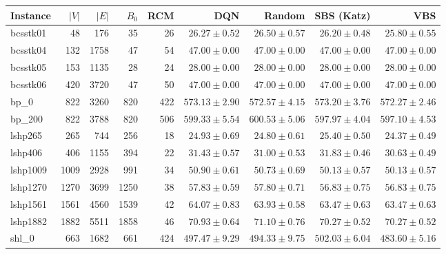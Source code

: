 \begin{tabular}{lrrrrrrrr}
\toprule
Instance & $|V|$ & $|E|$ & $B_0$ & RCM & DQN & Random & SBS (Katz) & VBS\\
\midrule
bcsstk01 & 48 & 176 & 35 & 26 & $26.27\pm0.52$ & $26.50\pm0.57$ & $26.20\pm0.48$ & $25.80\pm0.55$\\
bcsstk04 & 132 & 1758 & 47 & 54 & $47.00\pm0.00$ & $47.00\pm0.00$ & $47.00\pm0.00$ & $47.00\pm0.00$\\
bcsstk05 & 153 & 1135 & 28 & 24 & $28.00\pm0.00$ & $28.00\pm0.00$ & $28.00\pm0.00$ & $28.00\pm0.00$\\
bcsstk06 & 420 & 3720 & 47 & 50 & $47.00\pm0.00$ & $47.00\pm0.00$ & $47.00\pm0.00$ & $47.00\pm0.00$\\
bp\_0 & 822 & 3260 & 820 & 422 & $573.13\pm2.90$ & $572.57\pm4.15$ & $573.20\pm3.76$ & $572.27\pm2.46$\\
bp\_200 & 822 & 3788 & 820 & 506 & $599.33\pm5.54$ & $600.53\pm5.06$ & $597.97\pm4.04$ & $597.10\pm4.53$\\
lshp265 & 265 & 744 & 256 & 18 & $24.93\pm0.69$ & $24.80\pm0.61$ & $25.40\pm0.50$ & $24.37\pm0.49$\\
lshp406 & 406 & 1155 & 394 & 22 & $31.43\pm0.57$ & $31.00\pm0.53$ & $31.83\pm0.46$ & $30.63\pm0.49$\\
lshp1009 & 1009 & 2928 & 991 & 34 & $50.90\pm0.61$ & $50.73\pm0.69$ & $50.13\pm0.57$ & $50.13\pm0.57$\\
lshp1270 & 1270 & 3699 & 1250 & 38 & $57.83\pm0.59$ & $57.80\pm0.71$ & $56.83\pm0.75$ & $56.83\pm0.75$\\
lshp1561 & 1561 & 4560 & 1539 & 42 & $64.07\pm0.83$ & $63.93\pm0.58$ & $63.47\pm0.63$ & $63.47\pm0.63$\\
lshp1882 & 1882 & 5511 & 1858 & 46 & $70.93\pm0.64$ & $71.10\pm0.76$ & $70.27\pm0.52$ & $70.27\pm0.52$\\
shl\_0 & 663 & 1682 & 661 & 424 & $497.47\pm9.29$ & $494.33\pm9.75$ & $502.03\pm6.04$ & $483.60\pm5.16$\\
\bottomrule
\end{tabular}

